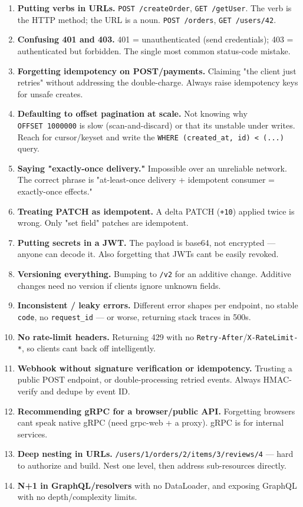 \documentclass[11pt]{article}
\begin{document}
\begin{enumerate}
\def\labelenumi{\arabic{enumi}.}
\item
  \textbf{Putting verbs in URLs.} \texttt{POST\ /createOrder}, \texttt{GET\ /getUser}. The verb is the HTTP method; the URL is a noun. \texttt{POST\ /orders}, \texttt{GET\ /users/42}.
\item
  \textbf{Confusing 401 and 403.} 401 = unauthenticated (send credentials); 403 = authenticated but forbidden. The single most common status-code mistake.
\item
  \textbf{Forgetting idempotency on POST/payments.} Claiming "the client just retries" without addressing the double-charge. Always raise idempotency keys for unsafe creates.
\item
  \textbf{Defaulting to offset pagination at scale.} Not knowing why \texttt{OFFSET\ 1000000} is slow (scan-and-discard) or that it\textquotesingle s unstable under writes. Reach for cursor/keyset and write the \texttt{WHERE\ (created\_at,\ id)\ \textless{}\ (...)} query.
\item
  \textbf{Saying "exactly-once delivery."} Impossible over an unreliable network. The correct phrase is "at-least-once delivery + idempotent consumer = exactly-once effects."
\item
  \textbf{Treating PATCH as idempotent.} A delta PATCH (\texttt{+10}) applied twice is wrong. Only "set field" patches are idempotent.
\item
  \textbf{Putting secrets in a JWT.} The payload is base64, not encrypted --- anyone can decode it. Also forgetting that JWTs can\textquotesingle t be easily revoked.
\item
  \textbf{Versioning everything.} Bumping to \texttt{/v2} for an additive change. Additive changes need no version if clients ignore unknown fields.
\item
  \textbf{Inconsistent / leaky errors.} Different error shapes per endpoint, no stable \texttt{code}, no \texttt{request\_id} --- or worse, returning stack traces in 500s.
\item
  \textbf{No rate-limit headers.} Returning 429 with no \texttt{Retry-After}/\texttt{X-RateLimit-*}, so clients can\textquotesingle t back off intelligently.
\item
  \textbf{Webhook without signature verification or idempotency.} Trusting a public POST endpoint, or double-processing retried events. Always HMAC-verify and dedupe by event ID.
\item
  \textbf{Recommending gRPC for a browser/public API.} Forgetting browsers can\textquotesingle t speak native gRPC (need grpc-web + a proxy). gRPC is for internal services.
\item
  \textbf{Deep nesting in URLs.} \texttt{/users/1/orders/2/items/3/reviews/4} --- hard to authorize and build. Nest one level, then address sub-resources directly.
\item
  \textbf{N+1 in GraphQL/resolvers} with no DataLoader, and exposing GraphQL with no depth/complexity limits.
\end{enumerate}
\end{document}

